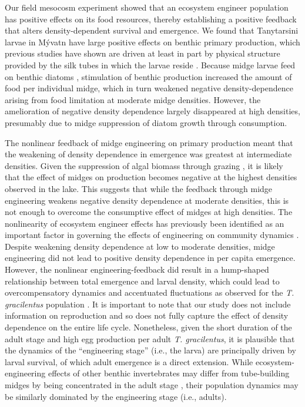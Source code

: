 \documentclass[12pt]{article}
\begin{document}
Our field mesocosm experiment showed that an ecosystem engineer population 
has positive effects on its food resources, 
thereby establishing a positive feedback 
that alters density-dependent survival and emergence. 
We found that Tanytarsini larvae in  M\'{y}vatn have large positive 
effects on benthic primary production,
which previous studies have shown are driven at least in part by physical 
structure provided by the silk tubes in which the larvae reside 
\citep{hoelker2015, phillips2019}.
Because midge larvae feed on benthic diatoms \citep{ingvason2004},
stimulation of benthic production increased the amount of food per individual midge,
which in turn weakened negative density-dependence arising from food limitation
at moderate midge densities.
However, the amelioration of negative density dependence largely disappeared at high densities,
presumably due to midge suppression of diatom growth through consumption.

The nonlinear feedback of midge engineering on primary production meant 
that the weakening of density dependence in emergence was greatest 
at intermediate densities. 
Given the suppression of algal biomass through grazing \citep{einarsson2016},
it is likely that the effect of midges on production becomes negative
at the highest densities observed in the lake.
This suggests that while the feedback through midge engineering weakens 
negative density dependence at moderate densities, 
this is not enough to overcome the consumptive effect of midges at high densities. 
The nonlinearity of ecosystem engineer effects has previously been identified 
as an important factor in governing the effects of engineering on community dynamics 
\citep{bozec2013}.
Despite weakening density dependence at low to moderate densities,
midge engineering did not lead to positive density dependence in per capita emergence.
However, the nonlinear engineering-feedback did result in a hump-shaped relationship
between total emergence and larval density, 
which could lead to overcompensatory dynamics and accentuated fluctuations as observed
for the \textit{T. gracilentus} population
\citep{turchin2003, cuddington2009}.
It is important to note that our study does not include information on reproduction
and so does not fully capture the effect of density  dependence on the entire life cycle.
Nonetheless, given the short duration of the adult stage and high egg production per adult 
\textit{T. gracilentus}, 
it is plausible that the dynamics of the ``engineering stage'' (i.e., the larva)
are principally driven by larval survival, of which adult emergence is a direct extension.
While ecosystem-engineering effects of other benthic invertebrates may differ from 
tube-building midges by being concentrated in the adult stage 
\citep[e.g., mussels;][]{largaespada2012},
their population dynamics may be similarly dominated by the
engineering stage (i.e., adults).
\end{document}
